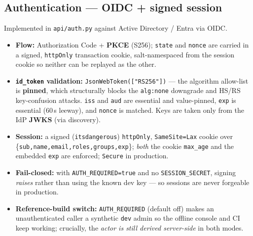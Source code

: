 \documentclass[11pt,a4paper]{article}
\newcommand{\code}[1]{\texttt{#1}}
\begin{document}
\subsection{Authentication --- OIDC + signed session}
Implemented in \code{api/auth.py} against Active Directory / Entra via OIDC.
\begin{itemize}
  \item \textbf{Flow:} Authorization Code + \textbf{PKCE} (S256); \code{state} and
        \code{nonce} are carried in a signed, \code{httpOnly} transaction cookie,
        salt-namespaced from the session cookie so neither can be replayed as the
        other.
  \item \textbf{\code{id\_token} validation:} \code{JsonWebToken(["RS256"])} ---
        the algorithm allow-list is \textbf{pinned}, which structurally blocks
        the \code{alg:none} downgrade and HS/RS key-confusion attacks.
        \code{iss} and \code{aud} are essential and value-pinned, \code{exp} is
        essential (60\,s leeway), and \code{nonce} is matched. Keys are taken
        only from the IdP \textbf{JWKS} (via discovery).
  \item \textbf{Session:} a signed (\code{itsdangerous}) \code{httpOnly},
        \code{SameSite=Lax} cookie over \{\code{sub,name,email,roles,groups,exp}\};
        \emph{both} the cookie \code{max\_age} and the embedded \code{exp} are
        enforced; \code{Secure} in production.
  \item \textbf{Fail-closed:} with \code{AUTH\_REQUIRED=true} and no
        \code{SESSION\_SECRET}, signing \emph{raises} rather than using the known
        dev key --- so sessions are never forgeable in production.
  \item \textbf{Reference-build switch:} \code{AUTH\_REQUIRED} (default off) makes
        an unauthenticated caller a synthetic \code{dev} admin so the offline
        console and CI keep working; crucially, the \emph{actor is still derived
        server-side} in both modes.
\end{itemize}
\end{document}
